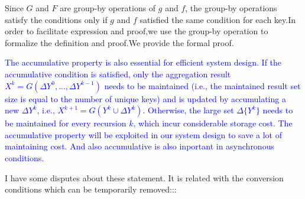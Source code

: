 {{\color{green}
Since $G$ and $F$ are group-by operations of $g$ and $f$, the group-by operations satisfy the conditions only if $g$ and $f$ satisfied the same condition for each key.In order to facilitate expression and proof,we use the group-by operation to formalize the definition and proof.We provide the formal proof.}

\textcolor{blue}{
The accumulative property is also essential for efficient system design. If the accumulative condition is satisfied, only the aggregation result $X^k=G(\Delta Y^{0},\ldots,\Delta Y^{k-1})$ needs to be maintained (i.e., the maintained result set size is equal to the number of unique keys) and is updated by accumulating a new $\Delta Y^{k}$, i.e., $X^{k+1}=G(Y^k \cup \Delta Y^k)$. Otherwise, the large set $\Delta \{Y^{k}\}$ needs to be maintained for every recursion $k$, which incur considerable storage cost. The accumulative property will be exploited in our system design to save a lot of maintaining cost. And also accumulative is also inportant in asynchronous conditions.
}

{\color{blue}
I have some disputes about these statement. It is related with the conversion conditions which can be temporarily removed:::	
	
}}
